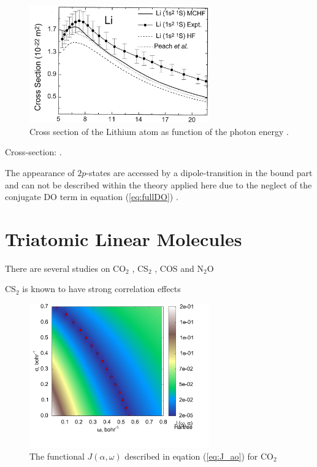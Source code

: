 \begin{figure}
\includegraphics[width=0.69\textwidth]{Figures/Lithium/Li_crossSect}
\caption{Cross section of the Lithium atom as function of the photon energy \cite{LiCS}.}
\label{fig:Lith-otrsh}
\end{figure}

Cross-section: \cite{LiCS}.

The appearance of $2p$-states are accessed by a dipole-transition in the bound part and can not be described within the theory applied here due to the neglect of the conjugate DO term in equation (\ref{eq:fullDO}) \cite{saPonzi}.

\section{Triatomic Linear Molecules}
There are several studies on CO$_2$ \cite{CO2, CO2_highres, HighResLinear, DiffLinear}, CS$_2$ \cite{DiffLinear,HighResLinear}, COS \cite{DiffLinear,HighResLinear} and N$_2$O \cite{DiffLinear}

CS$_2$ is known to have strong correlation effects \cite{2phcederbaum}
\begin{figure}
\includegraphics[width=0.69\textwidth]{Figures/CO2_J0_2D_terrain}
\caption{The functional $J(\alpha,\omega)$ described in eqation (\ref{eq:J_ao}) for CO$_2$}
\label{fig:CO2-otrsh}
\end{figure}

